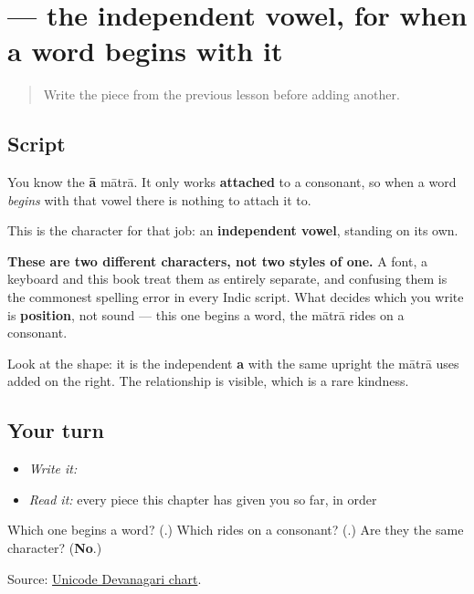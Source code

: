 \section[\texorpdfstring{\hi{आ} (ā)}{आ (ā)}]{ — the independent vowel, for when a word begins with it}

\label{lesson:HI-W12-aa}



\begin{quote}
Write the piece from the previous lesson before adding another.
\end{quote}

\subsection*{Script}

\begin{quote}
\end{quote}

You know the \textbf{ā} mātrā. It only works \textbf{attached} to a consonant, so when a word \emph{begins} with that vowel there is nothing to attach it to.

This is the character for that job: an \textbf{independent vowel}, standing on its own.

\textbf{These are two different characters, not two styles of one.} A font, a keyboard and this book treat them as entirely separate, and confusing them is the commonest spelling error in every Indic script. What decides which you write is \textbf{position}, not sound — this one begins a word, the mātrā rides on a consonant.

Look at the shape: it is the independent \textbf{a} with the same upright the mātrā uses added on the right. The relationship is visible, which is a rare kindness.

\subsection*{Your turn}
\begin{itemize}
\raggedright
  \item \emph{Write it:} 
  \item \emph{Read it:} every piece this chapter has given you so far, in order
\end{itemize}

\begin{tcolorbox}[breakable,colback=teal!4,colframe=teal!35!black,title={Before you move on}]
Which one begins a word? (\textbf{}.) Which rides on a consonant? (\textbf{}.) Are they the same character? (\textbf{No}.)

Source: \href{https://www.unicode.org/charts/PDF/U0900.pdf}{Unicode Devanagari chart}.
\end{tcolorbox}
